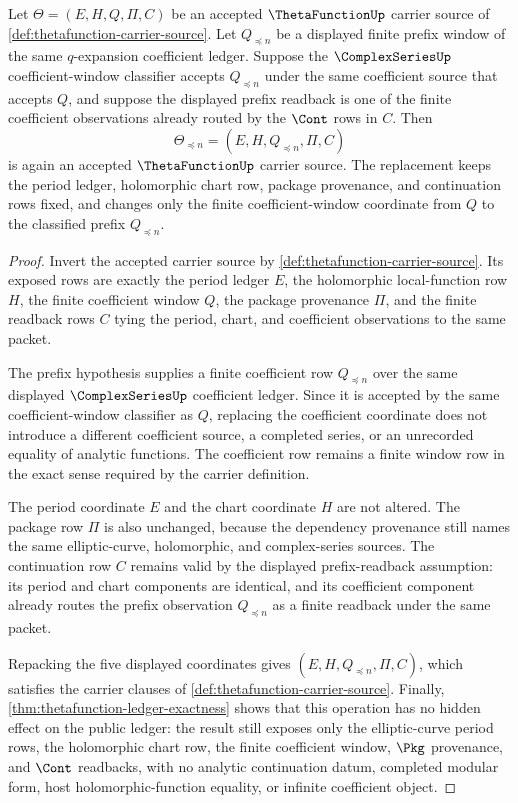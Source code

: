 \begin{theorem}
\label{thm:thetafunction-coefficient-prefix-restriction-carrier}
Let $\Theta=(E,H,Q,\Pi,C)$ be an accepted $\ThetaFunctionUp$ carrier source of \autoref{def:thetafunction-carrier-source}. Let $Q_{\preceq n}$ be a displayed finite prefix window of the same $q$-expansion coefficient ledger. Suppose the $\ComplexSeriesUp$ coefficient-window classifier accepts $Q_{\preceq n}$ under the same coefficient source that accepts $Q$, and suppose the displayed prefix readback is one of the finite coefficient observations already routed by the $\Cont$ rows in $C$. Then
$$
\Theta_{\preceq n}=(E,H,Q_{\preceq n},\Pi,C)
$$
is again an accepted $\ThetaFunctionUp$ carrier source. The replacement keeps the period ledger, holomorphic chart row, package provenance, and continuation rows fixed, and changes only the finite coefficient-window coordinate from $Q$ to the classified prefix $Q_{\preceq n}$.
\end{theorem}
\begin{proof}
Invert the accepted carrier source by \autoref{def:thetafunction-carrier-source}. Its exposed rows are exactly the period ledger $E$, the holomorphic local-function row $H$, the finite coefficient window $Q$, the package provenance $\Pi$, and the finite readback rows $C$ tying the period, chart, and coefficient observations to the same packet.

The prefix hypothesis supplies a finite coefficient row $Q_{\preceq n}$ over the same displayed $\ComplexSeriesUp$ coefficient ledger. Since it is accepted by the same coefficient-window classifier as $Q$, replacing the coefficient coordinate does not introduce a different coefficient source, a completed series, or an unrecorded equality of analytic functions. The coefficient row remains a finite window row in the exact sense required by the carrier definition.

The period coordinate $E$ and the chart coordinate $H$ are not altered. The package row $\Pi$ is also unchanged, because the dependency provenance still names the same elliptic-curve, holomorphic, and complex-series sources. The continuation row $C$ remains valid by the displayed prefix-readback assumption: its period and chart components are identical, and its coefficient component already routes the prefix observation $Q_{\preceq n}$ as a finite readback under the same packet.

Repacking the five displayed coordinates gives $(E,H,Q_{\preceq n},\Pi,C)$, which satisfies the carrier clauses of \autoref{def:thetafunction-carrier-source}. Finally, \autoref{thm:thetafunction-ledger-exactness} shows that this operation has no hidden effect on the public ledger: the result still exposes only the elliptic-curve period rows, the holomorphic chart row, the finite coefficient window, $\Pkg$ provenance, and $\Cont$ readbacks, with no analytic continuation datum, completed modular form, host holomorphic-function equality, or infinite coefficient object.
\end{proof}
